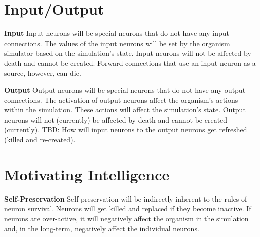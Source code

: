 \documentclass{article} %
\begin{document}
    
    \section{Input/Output}

        \textbf{Input} Input neurons will be special neurons that do not have any input connections. The values of the input neurons will be set by the organism simulator based on the simulation's state. Input neurons will not be affected by death and cannot be created. Forward connections that use an input neuron as a source, however, can die.

        \textbf{Output} Output neurons will be special neurons that do not have any output connections. The activation of output neurons affect the organism's actions within the simulation. These actions will affect the simulation's state. Output neurons will not (currently) be affected by death and cannot be created (currently). TBD: How will input neurons to the output neurons get refreshed (killed and re-created).

    \section{Motivating Intelligence}

        \textbf{Self-Preservation} Self-preservation will be indirectly inherent to the rules of neuron survival. Neurons will get killed and replaced if they become inactive. If neurons are over-active, it will negatively affect the organism in the simulation and, in the long-term, negatively affect the individual neurons.\newline

        
\end{document}
